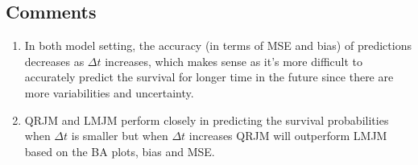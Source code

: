 \documentclass{article}
\begin{document}
\subsection{Comments}
\begin{enumerate}
\item In both model setting, the accuracy (in terms of MSE and bias) of predictions decreases as $\Delta t$ increases, which makes sense as it's more difficult to accurately predict the survival for longer time in the future since there are more variabilities and uncertainty.
\item QRJM and LMJM perform closely in predicting the survival probabilities when $\Delta t$ is smaller but when $\Delta t$ increases QRJM will outperform LMJM based on the BA plots, bias and MSE.
\end{enumerate}
\end{document}
